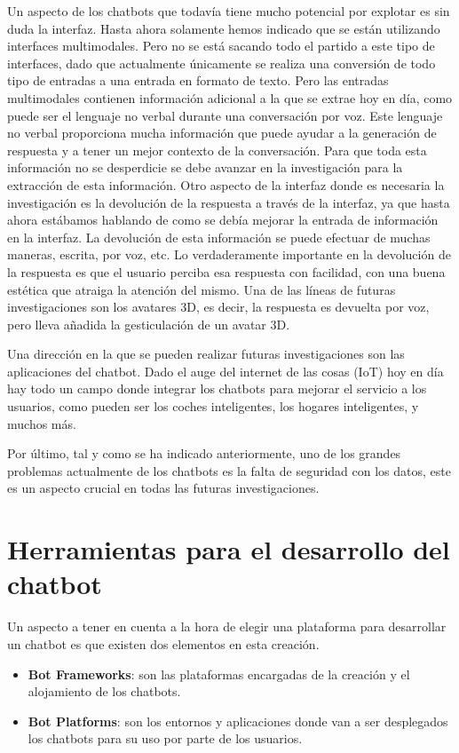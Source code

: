 Un aspecto de los chatbots que todavía tiene mucho potencial por explotar es sin duda la interfaz. Hasta ahora solamente hemos indicado que se están utilizando interfaces multimodales. Pero no se está sacando todo el partido a este tipo de interfaces, dado que actualmente únicamente se realiza una conversión de todo tipo de entradas a una entrada en formato de texto. Pero las entradas multimodales contienen información adicional a la que se extrae hoy en día, como puede ser el lenguaje no verbal durante una conversación por voz. Este lenguaje no verbal proporciona mucha información que puede ayudar a la generación de respuesta y a tener un mejor contexto de la conversación. Para que toda esta información no se desperdicie se debe avanzar en la investigación para la extracción de esta información. Otro aspecto de la interfaz donde es necesaria la investigación es la devolución de la respuesta a través de la interfaz, ya que hasta ahora estábamos hablando de como se debía mejorar la entrada de información en la interfaz. La devolución de esta información se puede efectuar de muchas maneras, escrita, por voz, etc. Lo verdaderamente importante en la devolución de la respuesta es que el usuario perciba esa respuesta con facilidad, con una buena estética que atraiga la atención del mismo. Una de las líneas de futuras investigaciones son los avatares 3D, es decir, la respuesta es devuelta por voz, pero lleva añadida la gesticulación de un avatar 3D.

Una dirección en la que se pueden realizar futuras investigaciones son las aplicaciones del chatbot. Dado el auge del internet de las cosas (IoT) hoy en día hay todo un campo donde integrar los chatbots para mejorar el servicio a los usuarios, como pueden ser los coches inteligentes, los hogares inteligentes, y muchos más.

Por último, tal y como se ha indicado anteriormente, uno de los grandes problemas actualmente de los chatbots es la falta de seguridad con los datos, este es un aspecto crucial en todas las futuras investigaciones.

\section{Herramientas para el desarrollo del chatbot}

Un aspecto a tener en cuenta a la hora de elegir una plataforma para desarrollar un chatbot es que existen dos elementos en esta creación.

\begin{itemize}
    \item \textbf{Bot Frameworks}: son las plataformas encargadas de la creación y el alojamiento de los chatbots.
    \item \textbf{Bot Platforms}: son los entornos y aplicaciones donde van a ser desplegados los chatbots para su uso por parte de los usuarios.
\end{itemize}

